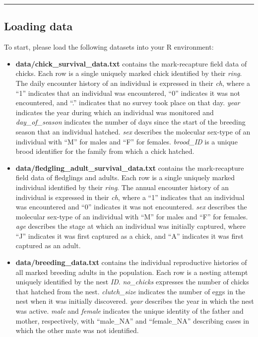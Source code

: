 \documentclass[]{article}
\begin{document}
\begin{center}\rule{0.5\linewidth}{\linethickness}\end{center}

\subsection{Loading data}\label{loading-data}

To start, please load the following datasets into your R environment:

\begin{itemize}
\item
  \textbf{data/chick\_survival\_data.txt} contains the mark-recapture
  field data of chicks. Each row is a single uniquely marked chick
  identified by their \emph{ring}. The daily encounter history of an
  individual is expressed in their \emph{ch}, where a ``1'' indicates
  that an individual was encountered, ``0'' indicates it was not
  encountered, and ``.'' indicates that no survey took place on that
  day. \emph{year} indicates the year during which an individual was
  monitored and \emph{day\_of\_season} indicates the number of days
  since the start of the breeding season that an individual hatched.
  \emph{sex} describes the molecular sex-type of an individual with
  ``M'' for males and ``F'' for females. \emph{brood\_ID} is a unique
  brood identifier for the family from which a chick hatched.
\item
  \textbf{data/fledgling\_adult\_survival\_data.txt} contains the
  mark-recapture field data of fledglings and adults. Each row is a
  single uniquely marked individual identified by their \emph{ring}. The
  annual encounter history of an individual is expressed in their
  \emph{ch}, where a ``1'' indicates that an individual was encountered
  and ``0'' indicates it was not encountered. \emph{sex} describes the
  molecular sex-type of an individual with ``M'' for males and ``F'' for
  females. \emph{age} describes the stage at which an individual was
  initially captured, where ``J'' indicates it was first captured as a
  chick, and ``A'' indicates it was first captured as an adult.
\item
  \textbf{data/breeding\_data.txt} contains the individual reproductive
  histories of all marked breeding adults in the population. Each row is
  a nesting attempt uniquely identified by the nest \emph{ID}.
  \emph{no\_chicks} expresses the number of chicks that hatched from the
  nest. \emph{clutch\_size} indicates the number of eggs in the nest
  when it was initially discovered. \emph{year} describes the year in
  which the nest was active. \emph{male} and \emph{female} indicates the
  unique identity of the father and mother, respectively, with
  ``male\_NA'' and ``female\_NA'' describing cases in which the other
  mate was not identified.
\end{itemize}
\end{document}
